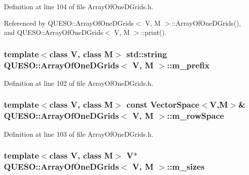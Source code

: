 Definition at line 104 of file Array\-Of\-One\-D\-Grids.\-h.



Referenced by Q\-U\-E\-S\-O\-::\-Array\-Of\-One\-D\-Grids$<$ V, M $>$\-::\-Array\-Of\-One\-D\-Grids(), and Q\-U\-E\-S\-O\-::\-Array\-Of\-One\-D\-Grids$<$ V, M $>$\-::print().

\hypertarget{class_q_u_e_s_o_1_1_array_of_one_d_grids_ae9f51dffdcb939ac6b85d700a60fe167}{
\subsubsection[{m\-\_\-prefix}]{\setlength{\rightskip}{0pt plus 5cm}template$<$class V, class M$>$ std\-::string {\bf Q\-U\-E\-S\-O\-::\-Array\-Of\-One\-D\-Grids}$<$ V, M $>$\-::m\-\_\-prefix\hspace{0.3cm}{\ttfamily [private]}}}\label{class_q_u_e_s_o_1_1_array_of_one_d_grids_ae9f51dffdcb939ac6b85d700a60fe167}


Definition at line 102 of file Array\-Of\-One\-D\-Grids.\-h.

\hypertarget{class_q_u_e_s_o_1_1_array_of_one_d_grids_af8f8d1a3e1d4f6213cf64698f95d34da}{
\subsubsection[{m\-\_\-row\-Space}]{\setlength{\rightskip}{0pt plus 5cm}template$<$class V, class M$>$ const {\bf Vector\-Space}$<$V,M$>$\& {\bf Q\-U\-E\-S\-O\-::\-Array\-Of\-One\-D\-Grids}$<$ V, M $>$\-::m\-\_\-row\-Space\hspace{0.3cm}{\ttfamily [private]}}}\label{class_q_u_e_s_o_1_1_array_of_one_d_grids_af8f8d1a3e1d4f6213cf64698f95d34da}


Definition at line 103 of file Array\-Of\-One\-D\-Grids.\-h.

\hypertarget{class_q_u_e_s_o_1_1_array_of_one_d_grids_ae2164bf692a8fed51b630a114824ffa7}{
\subsubsection[{m\-\_\-sizes}]{\setlength{\rightskip}{0pt plus 5cm}template$<$class V, class M$>$ V$\ast$ {\bf Q\-U\-E\-S\-O\-::\-Array\-Of\-One\-D\-Grids}$<$ V, M $>$\-::m\-\_\-sizes\hspace{0.3cm}{\ttfamily [private]}}}\label{class_q_u_e_s_o_1_1_array_of_one_d_grids_ae2164bf692a8fed51b630a114824ffa7}


